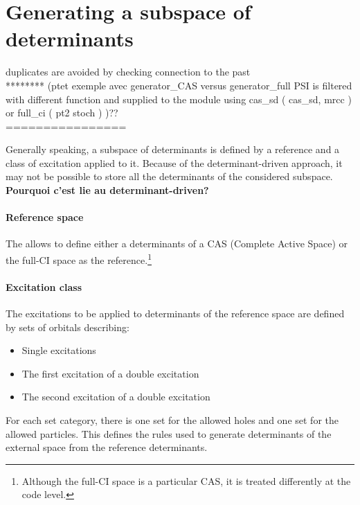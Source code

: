  
\section{Generating a subspace of determinants}
\alert{
duplicates are avoided by checking connection to the past \\
******** (ptet exemple avec generator\_CAS versus generator\_full PSI is filtered with different function and supplied to the module using cas\_sd ( cas\_sd, mrcc ) or full\_ci ( pt2 stoch ) )?? \\
================
}

Generally speaking, a subspace of determinants is defined by a reference and a class of excitation applied to it.
\alert{
Because of the determinant-driven approach, it may not be possible to store all the determinants of the considered subspace. \textbf{Pourquoi c'est lie au determinant-driven?}
}



\paragraph{Reference space}
The \QP allows to define either a determinants of a CAS (Complete Active Space) or the full-CI space as the reference.\footnote{Although the full-CI space is a particular CAS, it is treated differently at the code level.}

\paragraph{Excitation class}
The excitations to be applied to determinants of the reference space are defined by sets of orbitals describing:
\begin{itemize}
\item
Single excitations
\item
The first excitation of a double excitation
\item
The second excitation of a double excitation
\end{itemize}
For each set category, there is one set for the allowed holes and one set for the allowed particles.
This defines the rules used to generate determinants of the external space from the reference determinants.

